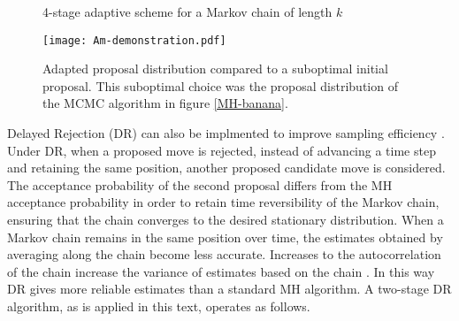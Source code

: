 \begin{figure}[h]
\begin{minipage}{1.0\linewidth}
\centering
\end{minipage}

\caption{4-stage adaptive scheme for a Markov chain of length $k$}
\label{4-stage-am}
\end{figure}

\begin{figure}[H]
	\centering
	\texttt{[image: Am-demonstration.pdf]}
	\caption{Adapted proposal distribution compared to a suboptimal initial proposal. This suboptimal choice was the proposal distribution of the MCMC algorithm in figure \ref{MH-banana}.}
	\label{AM-demonstration}
\end{figure}

Delayed Rejection (DR) can also be implmented to improve sampling efficiency \citep{Mira2001}. Under DR, when a proposed move is rejected, instead of advancing a time step and retaining the same position, another proposed candidate move is considered. The acceptance probability of the second proposal differs from the MH acceptance probability in order to retain time reversibility of the Markov chain, ensuring that the chain converges to the desired stationary distribution. When a Markov chain remains in the same position over time, the estimates obtained by averaging along the chain become less accurate. Increases to the autocorrelation of the chain increase the variance of estimates based on the chain \citep{Mira2001}. In this way DR gives more reliable estimates than a standard MH algorithm. A two-stage DR algorithm, as is applied in this text, operates as follows. \\

